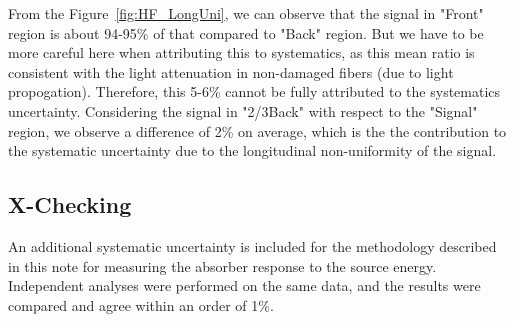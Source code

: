 From the Figure~\ref{fig:HF_LongUni}, we can observe that the signal in "Front" region is about 94-95\% of that compared to "Back" region. But we have to be more careful here when attributing this to systematics, as this mean ratio is consistent with the light attenuation in non-damaged fibers (due to light propogation). Therefore, this 5-6\% cannot be fully attributed to the systematics uncertainty. Considering the signal in "2/3Back" with respect to the "Signal" region, we observe a difference of 2\% on average, which is the the contribution to the systematic uncertainty due to the longitudinal non-uniformity of the signal.

\subsection{X-Checking}
An additional systematic uncertainty is included for the
methodology described in this note for measuring the absorber response to the source energy.
Independent analyses were performed on the same data, and the results were compared and agree
within an order of 1\%.

\begin{table}[!h] \centering {}
    \caption{Source tube regions defined to provide a measure of uncertainty on
    the charge deposited in various regions along the source tube}
    \label{tab:TubeRegions}
\end{table}

